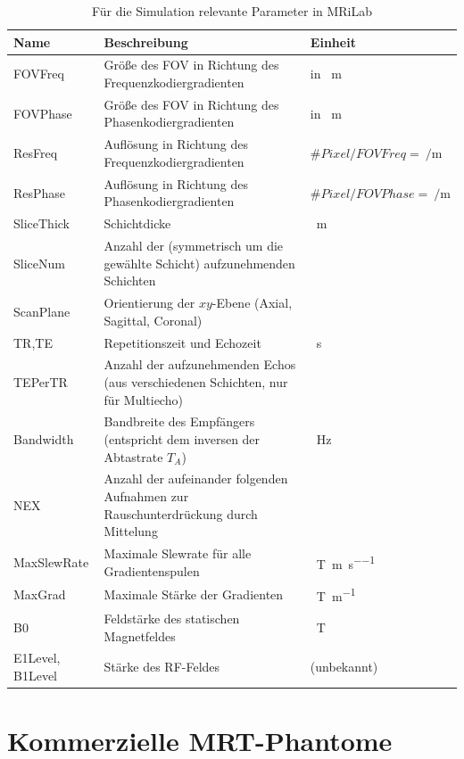 \begin{table}[H]
	\caption{Für die Simulation relevante Parameter in MRiLab}
	\centering
	\begin{tabularx}{\textwidth}{l X l}
		\toprule
		\textbf{Name} & \textbf{Beschreibung} & \textbf{Einheit} \\
		\midrule
		FOVFreq & Größe des FOV in Richtung des Frequenzkodiergradienten & in \SI{}{\m}\\
		FOVPhase & Größe des FOV in Richtung des Phasenkodiergradienten & in \SI{}{\m}\\
		ResFreq & Auflösung in Richtung des Frequenzkodiergradienten & $\#Pixel/FOVFreq=\SI{}{\per\m}$\\
		ResPhase & Auflösung in Richtung des Phasenkodiergradienten & $\#Pixel/FOVPhase=\SI{}{\per\m}$\\
		SliceThick & Schichtdicke & \SI{}{\m}\\
		SliceNum & Anzahl der (symmetrisch um die gewählte Schicht) aufzunehmenden Schichten & \\
		ScanPlane & Orientierung der $xy$-Ebene (Axial, Sagittal, Coronal) & \\
		TR,TE & Repetitionszeit und Echozeit & \SI{}{\s}\\
		TEPerTR & Anzahl der aufzunehmenden Echos (aus verschiedenen Schichten, nur für Multiecho) & \\
		Bandwidth & Bandbreite des Empfängers (entspricht dem inversen der Abtastrate $T_A$) & \SI{}{\hertz}\\
		NEX & Anzahl der aufeinander folgenden Aufnahmen zur Rauschunterdrückung durch Mittelung & \\
		MaxSlewRate & Maximale Slewrate für alle Gradientenspulen & \SI{}{\tesla\per\m\per\s}\\
		MaxGrad & Maximale Stärke der Gradienten & \SI{}{\tesla\per\m}\\
		B0 & Feldstärke des statischen Magnetfeldes & \SI{}{\tesla}\\
		E1Level, B1Level & Stärke des RF-Feldes & (unbekannt)\\
		\bottomrule
	\end{tabularx}
	\label{tab:mriLabParam}
\end{table}


\section{Kommerzielle MRT-Phantome}


